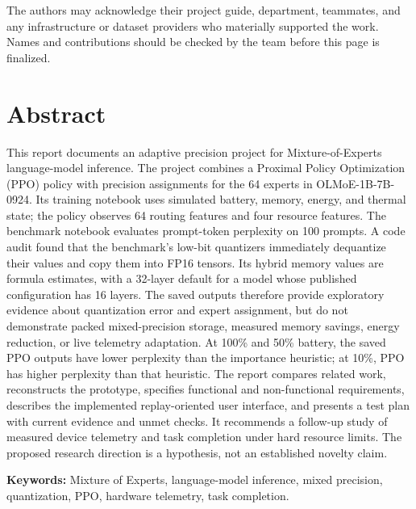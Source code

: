 \documentclass[12pt,a4paper]{report}
\begin{document}
The authors may acknowledge their project guide, department, teammates, and any infrastructure or dataset providers who materially supported the work. Names and contributions should be checked by the team before this page is finalized.

\chapter*{Abstract}
This report documents an adaptive precision project for Mixture-of-Experts language-model inference. The project combines a Proximal Policy Optimization (PPO) policy with precision assignments for the 64 experts in OLMoE-1B-7B-0924. Its training notebook uses simulated battery, memory, energy, and thermal state; the policy observes 64 routing features and four resource features. The benchmark notebook evaluates prompt-token perplexity on 100 prompts. A code audit found that the benchmark's low-bit quantizers immediately dequantize their values and copy them into FP16 tensors. Its hybrid memory values are formula estimates, with a 32-layer default for a model whose published configuration has 16 layers. The saved outputs therefore provide exploratory evidence about quantization error and expert assignment, but do not demonstrate packed mixed-precision storage, measured memory savings, energy reduction, or live telemetry adaptation. At 100\% and 50\% battery, the saved PPO outputs have lower perplexity than the importance heuristic; at 10\%, PPO has higher perplexity than that heuristic. The report compares related work, reconstructs the prototype, specifies functional and non-functional requirements, describes the implemented replay-oriented user interface, and presents a test plan with current evidence and unmet checks. It recommends a follow-up study of measured device telemetry and task completion under hard resource limits. The proposed research direction is a hypothesis, not an established novelty claim.

\textbf{Keywords:} Mixture of Experts, language-model inference, mixed precision, quantization, PPO, hardware telemetry, task completion.

\tableofcontents
\clearpage
\listoffigures
{}
\clearpage
\listoftables
{}
\clearpage
\end{document}
